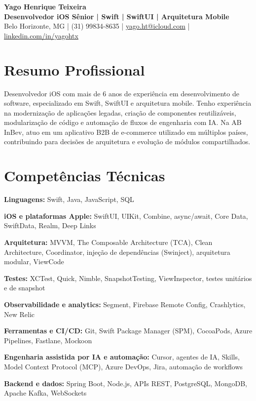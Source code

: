 \documentclass[10pt,a4paper]{article}
\begin{document}
\begin{center}
{\Large\bfseries Yago Henrique Teixeira}\\[3pt]
\textbf{Desenvolvedor iOS Sênior | Swift | SwiftUI | Arquitetura Mobile}\\[3pt]
Belo Horizonte, MG \quad | \quad (31) 99834-8635 \quad | \quad
\href{mailto:yago.ht@icloud.com}{yago.ht@icloud.com} \quad | \quad
\href{https://www.linkedin.com/in/yagohtx/}{linkedin.com/in/yagohtx}
\end{center}

\section{Resumo Profissional}

Desenvolvedor iOS com mais de 6 anos de experiência em desenvolvimento de software, especializado em Swift, SwiftUI e arquitetura mobile. Tenho experiência na modernização de aplicações legadas, criação de componentes reutilizáveis, modularização de código e automação de fluxos de engenharia com IA. Na AB InBev, atuo em um aplicativo B2B de e-commerce utilizado em múltiplos países, contribuindo para decisões de arquitetura e evolução de módulos compartilhados.

\section{Competências Técnicas}

\textbf{Linguagens:} Swift, Java, JavaScript, SQL

\textbf{iOS e plataformas Apple:} SwiftUI, UIKit, Combine, async/await, Core Data, SwiftData, Realm, Deep Links

\textbf{Arquitetura:} MVVM, The Composable Architecture (TCA), Clean Architecture, Coordinator, injeção de dependências (Swinject), arquitetura modular, ViewCode

\textbf{Testes:} XCTest, Quick, Nimble, SnapshotTesting, ViewInspector, testes unitários e de snapshot

\textbf{Observabilidade e analytics:} Segment, Firebase Remote Config, Crashlytics, New Relic

\textbf{Ferramentas e CI/CD:} Git, Swift Package Manager (SPM), CocoaPods, Azure Pipelines, Fastlane, Mockoon

\textbf{Engenharia assistida por IA e automação:} Cursor, agentes de IA, Skills, Model Context Protocol (MCP), Azure DevOps, Jira, automação de workflows

\textbf{Backend e dados:} Spring Boot, Node.js, APIs REST, PostgreSQL, MongoDB, Apache Kafka, WebSockets
\end{document}
